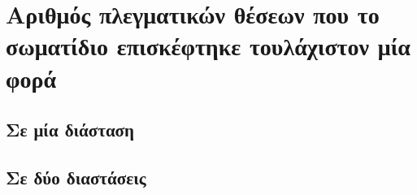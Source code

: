 \section{Αριθμός πλεγματικών θέσεων που το σωματίδιο επισκέφτηκε τουλάχιστον μία φορά}
\subsection{Σε μία διάσταση}
\subsection{Σε δύο διαστάσεις}
